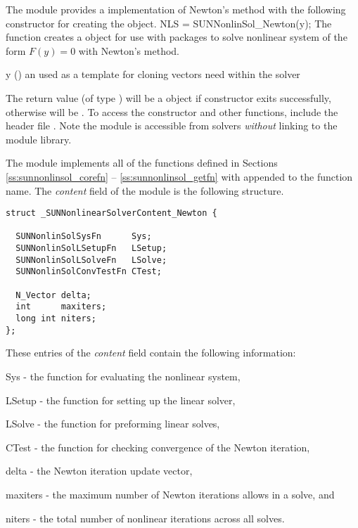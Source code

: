 The {\sunnonlinsolnewton} module provides a {\sunnonlinsol}
implementation of Newton's method with the following constructor for
creating the  object.
{
  NLS = SUNNonlinSol\_Newton(y);
}
{
  The function  creates a
   object for use with {\sundials} packages to
  solve nonlinear system of the form $F(y) = 0$ with Newton's method.
}
{
  \begin{args}[y]
  \item[y] ()
    an  used as a template for cloning vectors need within
    the solver
  \end{args}
}
{
  The return value  (of type ) will be
  a {\sunnonlinsol} object if constructor exits successfully,
  otherwise  will be .
}
{}
To access the constructor and other {\sunnonlinsolnewton} functions,
include the header file . Note
the {\sunnonlinsolnewton} module is accessible from {\sundials}
solvers \textit{without} linking to the
 module library.

The {\sunnonlinsolnewton} module implements all of the functions
defined in Sections \ref{ss:sunnonlinsol_corefn} --
\ref{ss:sunnonlinsol_getfn} with  appended to the
function name. The \textit{content} field of the {\sunnonlinsolnewton}
module is the following structure.
\begin{verbatim} 
struct _SUNNonlinearSolverContent_Newton {

  SUNNonlinSolSysFn      Sys;
  SUNNonlinSolLSetupFn   LSetup;
  SUNNonlinSolLSolveFn   LSolve;
  SUNNonlinSolConvTestFn CTest;

  N_Vector delta;
  int      maxiters;
  long int niters;
};
\end{verbatim}
These entries of the \emph{content} field contain the following
information:
\begin{args}[maxiters]
  \item[Sys] - the function for evaluating the nonlinear system,
  \item[LSetup] - the function for setting up the linear solver,
  \item[LSolve] - the function for preforming linear solves,
  \item[CTest] - the function for checking convergence of the Newton
    iteration,
  \item[delta] - the Newton iteration update vector,
  \item[maxiters] - the maximum number of Newton iterations allows in
    a solve, and
  \item[niters] - the total number of nonlinear iterations across all
    solves.
\end{args}

